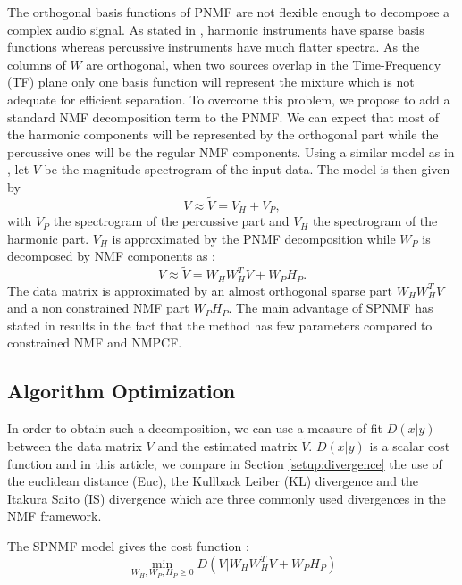 \documentclass[journal]{IEEEtran}
\begin{document}
The orthogonal basis functions of PNMF are not flexible enough to decompose a complex audio signal. As stated in \cite{canadas2014percussive}, harmonic instruments have sparse basis functions whereas percussive instruments have much flatter spectra. As the columns of $W$ are orthogonal, when two sources overlap in the Time-Frequency (TF) plane only one basis function will represent the mixture which is not adequate for efficient separation. To overcome this problem, we propose to add a standard NMF decomposition term to the PNMF. We can expect that most of the harmonic components will be represented by the orthogonal part while the percussive ones will be the regular NMF components. Using a similar model as in \cite{laroche2015structured}, let $V$ be the magnitude spectrogram of the input data. The model is then given by
\begin{equation} \label{Cfunction}
V \approx \tilde{V}= V_H + V_{P},
\end{equation}
with $V_P$ the spectrogram of the percussive part and $V_H$ the spectrogram of the harmonic part. $V_H$ is approximated by the PNMF decomposition while $W_P$ is decomposed by NMF components as :
\begin{equation}
V \approx \tilde{V}= W_{H}W_{H}^{T}V + W_{P} H_{P}.
\end{equation}
The data matrix is approximated by an almost orthogonal sparse part $W_HW_H^T V$ and a non constrained NMF part $W_PH_P$. The main advantage of SPNMF has stated in \cite{laroche2015structured} results in the fact that the method has few parameters compared to constrained NMF and NMPCF.

\subsection{Algorithm Optimization}

In order to obtain such a decomposition, we can use a measure of fit $D(x|y)$ between the data matrix $V$ and the estimated matrix $\tilde{V}$. $D(x|y)$ is a scalar cost function and in this article, we compare in Section \ref{setup:divergence} the use of the euclidean distance (Euc), the Kullback Leiber (KL) divergence and the Itakura Saito (IS) divergence which are three commonly used divergences in the NMF framework.



The SPNMF model gives the cost function : 
\begin{equation}\label{InitCost}
\min_{W_H,W_P,H_P \geq 0} D(V|W_{H}W_{H}^{T}V + W_{P} H_{P})  
\end{equation}
\end{document}
